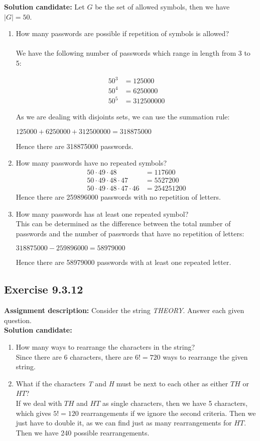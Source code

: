 \documentclass{report}
\newcommand{\cent}[1]{\begin{center}#1\end{center}}
\newcommand{\mAlign}[1]{\begin{align*}#1\end{align*}}
\newcommand{\AssignmentDescription}{\textbf{Assignment description: }}
\newcommand{\Solution}{\textbf{Solution candidate: }}
\newcommand{\Exercise}[1]{\subsection{Exercise #1}}
\newcommand{\defaultEnumerateLabel}{\textbf{\alph*.}}
\newcommand{\MyItem}[1]{\item #1\\}
\newcommand{\LetterEnumeration}[1]{\begin{enumerate}[label = \defaultEnumerateLabel]
		#1
\end{enumerate}}
\begin{document}
 	\Solution
 	Let $G$ be the set of allowed symbols, then we have $|G| =  50$.
 	\LetterEnumeration{
 		\MyItem{How many passwords are possible if repetition of symbols is allowed?\\}
 		
 		We have the following number of passwords which range in length from 3 to 5:
 		
 		\mAlign{
 			50^3 &= 125000 \\
 			50^4 &= 6250000\\
 			50^5 &= 312500000
 		}
 		
 		As we are dealing with disjoints sets, we can use the summation rule:
 		
 		\cent{$125000 + 6250000 + 312500000 = 318875000 $}
 		
 		Hence there are 318875000 passwords.\\
 		
 		\MyItem{How many passwords have no repeated symbols?}
 		
 		\mAlign{
 			50 \cdot 49 \cdot 48 &= 117600 \\
 			50 \cdot 49 \cdot 48 \cdot 47 &= 5527200\\
 			50 \cdot 49 \cdot 48 \cdot 47 \cdot 46 & = 254251200
 		}
 	Hence there are 259896000 passwords with no repetition of letters.\\
 	
 	\MyItem{How many passwords has at least one repeated symbol?}
 	
 	This can be determined as the difference between the total number of passwords and the number of passwords that have no repetition of letters:
 	
 	\cent{$318875000 - 259896000 = 58979000$}
 	
 	Hence there are 58979000 passwords with at least one repeated letter.\\
 	}
 		
 	\Exercise{9.3.12}
 	\AssignmentDescription
 	Consider the string \textit{THEORY}. Answer each given question.\\
 	\Solution
 	
 	\LetterEnumeration{
 		\MyItem{How many ways to rearrange the characters in the string?}
 		
 		Since there are 6 characters, there are $6! = 720$ ways to rearrange the given string.\\
 		
 		\MyItem{What if the characters \textit{T} and \textit{H} must be next to each other as either $TH$ or $HT$?}
 		
 		If we deal with $TH$ and $HT$ as single characters, then we have 5 characters, which gives $5! = 120 $ rearrangements if we ignore the second criteria. Then we just have to double it, as we can find just as many rearrangements for $HT$. Then we have 240 possible rearrangements.\\
 		
 	}
 	
\end{document}
